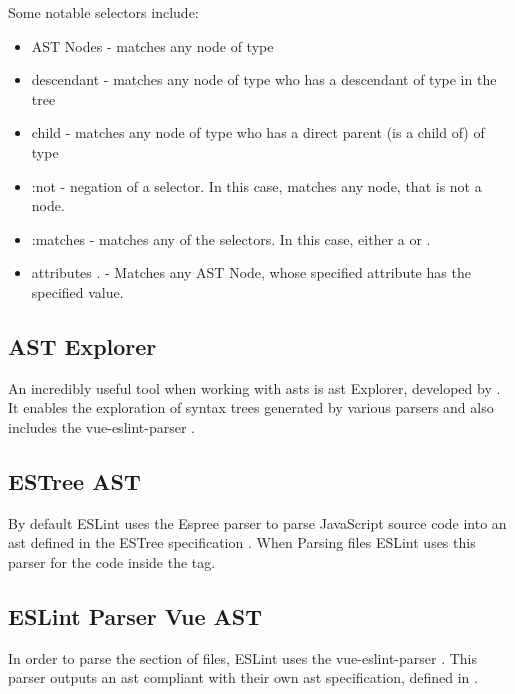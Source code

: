 Some notable selectors include:
\begin{itemize}
  \item AST Nodes  - matches any node of type 
  \item descendant  - matches any node of type  who has a descendant of type  in the tree
  \item child   - matches any node of type  who has a direct parent (is a child of) of type 
  \item :not  - negation of a selector. In this case, matches any node, that is not a  node.
  \item :matches -  matches any of the selectors. In this case, either a  or .
  \item attributes . - Matches any AST Node, whose specified attribute has the specified value.
\end{itemize}

\subsection{AST Explorer}
An incredibly useful tool when working with \glspl{ast} is \gls{ast} Explorer, developed by \textcite{astexplorer_fkling2021Jan}. It enables the exploration of syntax trees generated by various parsers and also includes the vue-eslint-parser \parencite{eslint_vue_parser}.

\subsection{ESTree AST}
By default ESLint uses the Espree \parencite{eslintEspree} parser to parse JavaScript source code into an \gls{ast} defined in the ESTree specification \parencite{estreeASTSpec}. When Parsing  files ESLint uses this parser for the code inside the  tag.
  
\subsection{ESLint Parser Vue AST}

In order to parse the  section of  files, ESLint uses the vue-eslint-parser \parencite{eslint_vue_parser}. This parser outputs an  \gls{ast} compliant with their own \gls{ast} specification, defined in \parencite{eslint_vue_parser_ast}.